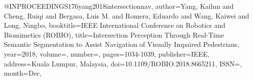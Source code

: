@INPROCEEDINGS{176yang2018intersectionnav,
author={Yang, Kailun and Cheng, Ruiqi and Bergasa, Luis M. and Romera, Eduardo and Wang, Kaiwei and Long, Ningbo},
booktitle={IEEE International Conference on Robotics and Biomimetics (ROBIO)}, 
title={Intersection Perception Through Real-Time Semantic Segmentation to Assist Navigation of Visually Impaired Pedestrians}, 
year={2018},
volume={},
number={},
pages={1034-1039},
publisher={IEEE},
address={Kuala Lumpur, Malaysia},
doi={10.1109/ROBIO.2018.8665211},
ISSN={},
month={Dec},}